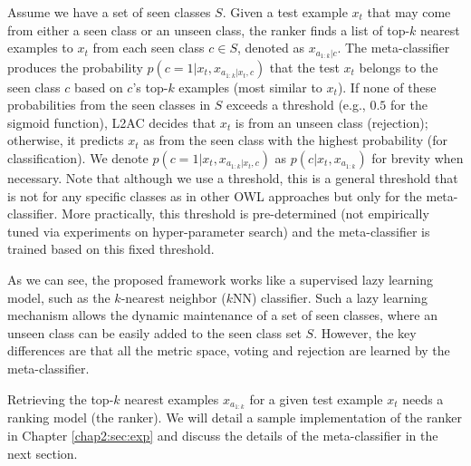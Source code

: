 Assume we have a set of seen classes $S$. 
Given a test example
$x_t$ that may come from either a seen class or an unseen class, the ranker finds a list of top-$k$ nearest examples to $x_t$ from each seen class $c \in S$, denoted as $x_{a_{1:k}|c}$.
The meta-classifier produces the probability $p(c=1|x_t, x_{a_{1:k}|x_t,c})$ that the test $x_t$ belongs to the seen class $c$ based on $c$'s top-$k$ examples (most similar to $x_t$).
If none of these probabilities from the seen classes in $S$ exceeds a threshold (e.g., $0.5$ for the sigmoid function), L2AC decides that $x_t$ is from an unseen class (rejection); otherwise, it predicts $x_t$ as from the seen class with the highest probability (for classification). 
We denote $p(c=1|x_t, x_{a_{1:k}|x_t,c})$ as $p(c|x_t, x_{a_{1:k}})$ for brevity when necessary.
Note that although we use a threshold, this is a general threshold that is not for any specific classes as in other OWL approaches but only for the meta-classifier. More practically, this threshold is pre-determined (not empirically tuned via experiments on hyper-parameter search) and the meta-classifier is trained based on this fixed threshold. 

As we can see, the proposed framework works like a supervised lazy learning model, such as the $k$-nearest neighbor ($k$NN) classifier.
Such a lazy learning mechanism allows the dynamic maintenance of a set of seen classes, where an unseen class can be easily added to the seen class set $S$. 
However, the key differences are that all the metric space, voting and rejection are learned by the meta-classifier.

Retrieving the top-$k$ nearest examples $x_{a_{1:k} }$ for a given test example $x_t$ needs a ranking model (the ranker).
We will detail a sample implementation of the ranker in Chapter \ref{chap2:sec:exp} 
and discuss the details of the meta-classifier in the next section.

